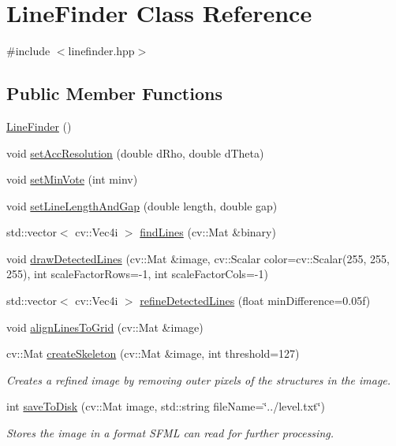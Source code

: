 \hypertarget{classLineFinder}{\section{Line\-Finder Class Reference}
\label{classLineFinder}
}


{\ttfamily \#include $<$linefinder.\-hpp$>$}

\subsection*{Public Member Functions}
\begin{DoxyCompactItemize}
\item 
\hyperlink{classLineFinder_ac9a83317df7ff3d74a9add150962e849}{Line\-Finder} ()
\item 
void \hyperlink{classLineFinder_a4ffb60e7c12143a6824b884239243da9}{set\-Acc\-Resolution} (double d\-Rho, double d\-Theta)
\item 
void \hyperlink{classLineFinder_af76de2e78cc28b37fd15652e2967e56b}{set\-Min\-Vote} (int minv)
\item 
void \hyperlink{classLineFinder_a7655dc9adfaca75ed92c585d226a60df}{set\-Line\-Length\-And\-Gap} (double length, double gap)
\item 
std\-::vector$<$ cv\-::\-Vec4i $>$ \hyperlink{classLineFinder_adb0567e29363788ba519cff1f1f6686d}{find\-Lines} (cv\-::\-Mat \&binary)
\item 
void \hyperlink{classLineFinder_aa20781cdf8620689b78c221d1f30371f}{draw\-Detected\-Lines} (cv\-::\-Mat \&image, cv\-::\-Scalar color=cv\-::\-Scalar(255, 255, 255), int scale\-Factor\-Rows=-\/1, int scale\-Factor\-Cols=-\/1)
\item 
std\-::vector$<$ cv\-::\-Vec4i $>$ \hyperlink{classLineFinder_a4fe5f72054ba400611549ea25c25904e}{refine\-Detected\-Lines} (float min\-Difference=0.\-05f)
\item 
void \hyperlink{classLineFinder_a7dbb0089ad37b33bdd904e1347775098}{align\-Lines\-To\-Grid} (cv\-::\-Mat \&image)
\item 
cv\-::\-Mat \hyperlink{classLineFinder_ad9aa51b43bb797b324305d3c89f5145f}{create\-Skeleton} (cv\-::\-Mat \&image, int threshold=127)
\begin{DoxyCompactList}\small\item\em Creates a refined image by removing outer pixels of the structures in the image. \end{DoxyCompactList}\item 
int \hyperlink{classLineFinder_a9dc74b9d8732aefeefdf8d439e1e043e}{save\-To\-Disk} (cv\-::\-Mat image, std\-::string file\-Name=\char`\"{}../level.\-txt\char`\"{})
\begin{DoxyCompactList}\small\item\em Stores the image in a format S\-F\-M\-L can read for further processing. \end{DoxyCompactList}\end{DoxyCompactItemize}


